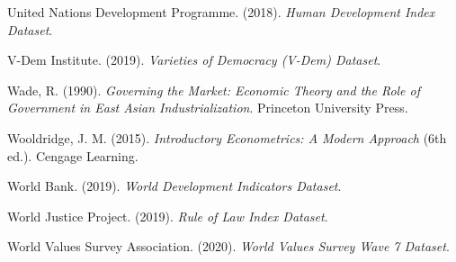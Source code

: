 \documentclass[12pt]{article}
\begin{document}
\begin{description}
    \item United Nations Development Programme. (2018). \textit{Human Development Index Dataset}.

    \item V-Dem Institute. (2019). \textit{Varieties of Democracy (V-Dem) Dataset}.

    \item Wade, R. (1990). \textit{Governing the Market: Economic Theory and the Role of Government in East Asian Industrialization}. Princeton University Press.

    \item Wooldridge, J. M. (2015). \textit{Introductory Econometrics: A Modern Approach} (6th ed.). Cengage Learning.

    \item World Bank. (2019). \textit{World Development Indicators Dataset}.

    \item World Justice Project. (2019). \textit{Rule of Law Index Dataset}.

    \item World Values Survey Association. (2020). \textit{World Values Survey Wave 7 Dataset}.

\end{description}
\end{document}
